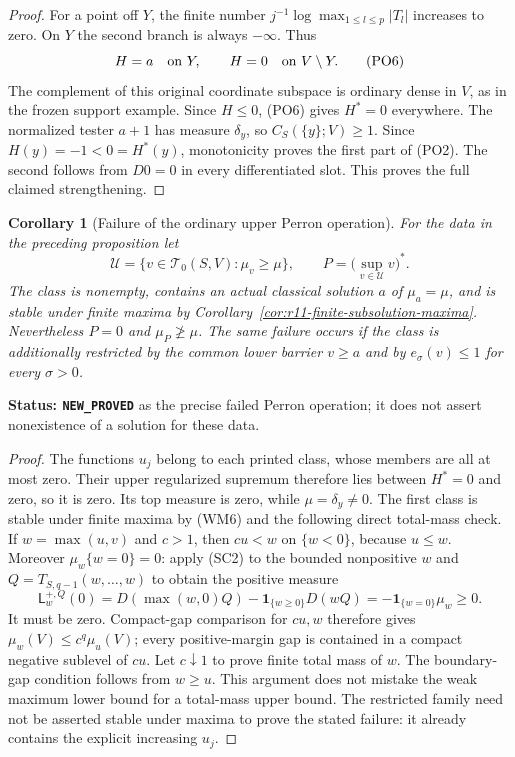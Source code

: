 \documentclass[11pt,a4paper]{article}
\numberwithin{equation}{section}
\newtheorem{corollary}[theorem]{Corollary}
\theoremstyle{definition}
\theoremstyle{remark}
\begin{document}
\begin{proof}
For a point off $Y$, the finite number
$j^{-1}\log\max_{1\leq l\leq p}|T_l|$ increases to zero. On $Y$ the second
branch is always $-\infty$. Thus
\[
                  H=a\quad\hbox{on }Y,\qquad
                  H=0\quad\hbox{on }V\setminus Y.
 \tag{PO6}
\]
The complement of this original coordinate subspace is
ordinary dense in $V$, as in the frozen support example.
Since $H\leq0$, (PO6) gives $H^*=0$ everywhere.
The normalized tester $a+1$ has measure $\delta_y$, so
$C_S(\{y\};V)\geq1$. Since $H(y)=-1<0=H^*(y)$,
monotonicity proves the first part of (PO2). The second
follows from $D0=0$ in every differentiated slot.
This proves the full claimed strengthening.
\end{proof}

\begin{corollary}[Failure of the ordinary upper Perron operation]
\label{cor:r11-ordinary-power-Perron-false}
For the data in the preceding proposition let
\[
 \mathscr U=\{v\in\mathscr T_0(S,V):\mu_v\geq\mu\},
              \qquad P=\bigl(\sup_{v\in\mathscr U}v\bigr)^*.
 \tag{PO7}
\]
The class is nonempty, contains an actual classical solution
$a$ of $\mu_a=\mu$, and is stable under finite maxima by
Corollary~\ref{cor:r11-finite-subsolution-maxima}.
Nevertheless $P=0$ and $\mu_P\not\geq\mu$.
The same failure occurs if the class is additionally restricted
by the common lower barrier $v\geq a$ and by
$e_\sigma(v)\leq1$ for every $\sigma>0$.
\end{corollary}

\noindent\textbf{Status: \texttt{NEW\_PROVED}} as the
precise failed Perron operation; it does not assert nonexistence
of a solution for these data.

\begin{proof}
The functions $u_j$ belong to each printed class, whose
members are all at most zero. Their upper regularized supremum
therefore lies between $H^*=0$ and zero, so it is zero.
Its top measure is zero, while $\mu=\delta_y\ne0$.
The first class is stable under finite maxima by (WM6) and
the following direct total-mass check. If $w=\max(u,v)$
and $c>1$, then $cu<w$ on $\{w<0\}$, because $u\leq w$.
Moreover $\mu_w\{w=0\}=0$: apply (SC2) to the bounded
nonpositive $w$ and $Q=T_{S,q-1}(w,\ldots,w)$ to obtain
the positive measure
\[
       \mathsf L_w^{+,Q}(0)
              =D(\max(w,0)Q)-\mathbf1_{\{w\geq0\}}D(wQ)
              =-\mathbf1_{\{w=0\}}\mu_w\geq0.
\]
It must be zero. Compact-gap comparison for $cu,w$ therefore
gives $\mu_w(V)\leq c^q\mu_u(V)$; every positive-margin
gap is contained in a compact negative sublevel of $cu$.
Let $c\downarrow1$ to prove finite total mass of $w$.
The boundary-gap condition follows from $w\geq u$.
This argument does not mistake the weak maximum lower bound
for a total-mass upper bound. The restricted family
need not be asserted stable under maxima to prove the stated
failure: it already contains the explicit increasing $u_j$.
\end{proof}
\end{document}
